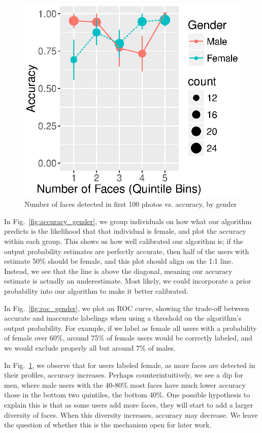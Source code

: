 \begin{figure}[h]
  \centering
  \includegraphics[width=.5\linewidth]{fig/census/facebin_gender.eps}
  \caption{Number of faces detected in first 100 photos vs. accuracy, by gender}
  \label{fig:facebin_gender}
\end{figure}

In Fig.~\ref{fig:accuracy_gender}, we group individuals on how what our algorithm predicts is the likelihood that that individual is female, and plot the accuracy within each group.
This shows us how well calibrated our algorithm is; if the output probability estimates are perfectly accurate, then half of the users with estimate 50\% should be female, and this plot should align on the 1:1 line.
Instead, we see that the line is above the diagonal, meaning our accuracy estimate is actually an underestimate.
Most likely, we could incorporate a prior probability into our algorithm to make it better calibrated.

In Fig.~\ref{fig:roc_gender}, we plot an ROC curve, showing the trade-off between accurate and inaccurate labelings when using a threshold on the algorithm's output probability.
For example, if we label as female all users with a probability of female over 60\%, around 75\% of female users would be correctly labeled, and we would exclude properly all but around 7\% of males.

In Fig.~\ref{fig:facebin_gender}, we observe that for users labeled female, as more faces are detected in their profiles, accuracy increases.
Perhaps counterintuitively, we see a dip for men, where male users with the 40-80\% most faces have much lower accuracy those in the bottom two quintiles, the bottom 40\%.
One possible hypothesis to explain this is that as some users add more faces, they will start to add a larger diversity of faces.
When this diversity increases, accuracy may decrease.
We leave the question of whether this is the mechanism open for later work.


